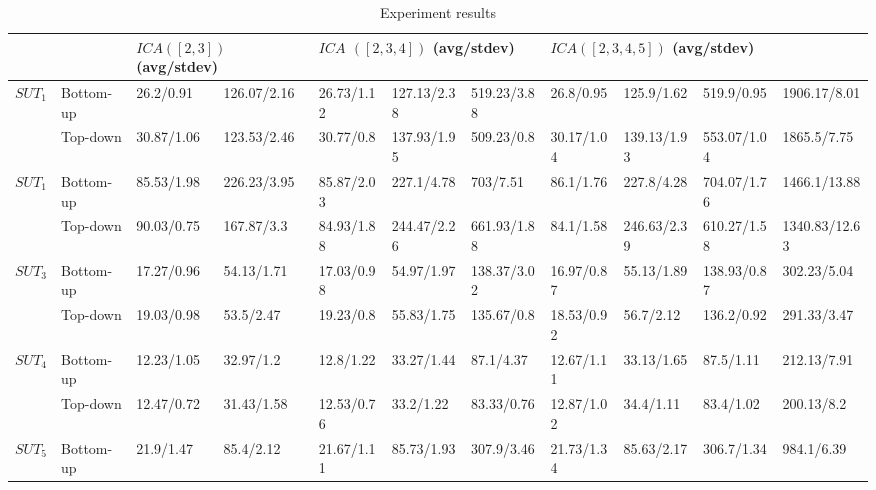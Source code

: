 \documentclass[conference]{IEEEtran}
\theoremstyle{definition}
\begin{document}

\begin{table}[htbp]
  \caption{Experiment results}
  \label{experiment_table}
\begin{tabular}{|l|l|ll|lll|llll|}
\hline
\multicolumn{2}{|l|}{}            & \multicolumn{2}{l|}{$ICA([2, 3])$ (avg/stdev)}& \multicolumn{3}{l|}{$ICA$ $([2, 3,4])$ (avg/stdev)}    & \multicolumn{4}{l|}{$ICA([2, 3,4,5])$ (avg/stdev) }                   \\ \hline
\multirow{2}{*}{$SUT_{1}$} & Bottom-up & 26.2/0.91        & 126.07/2.16      & 26.73/1.12 & 127.13/2.38 & 519.23/3.88 & 26.8/0.95  & 125.9/1.62  & 519.9/0.95  & 1906.17/8.01  \\
                      & Top-down  & 30.87/1.06       & 123.53/2.46      & 30.77/0.8  & 137.93/1.95 & 509.23/0.8  & 30.17/1.04 & 139.13/1.93 & 553.07/1.04 & 1865.5/7.75   \\ \hline
\multirow{2}{*}{$SUT_{1}$} & Bottom-up & 85.53/1.98       & 226.23/3.95      & 85.87/2.03 & 227.1/4.78  & 703/7.51    & 86.1/1.76  & 227.8/4.28  & 704.07/1.76 & 1466.1/13.88  \\
                      & Top-down  & 90.03/0.75       & 167.87/3.3       & 84.93/1.88 & 244.47/2.26 & 661.93/1.88 & 84.1/1.58  & 246.63/2.39 & 610.27/1.58 & 1340.83/12.63 \\ \hline
\multirow{2}{*}{$SUT_{3}$} & Bottom-up & 17.27/0.96       & 54.13/1.71       & 17.03/0.98 & 54.97/1.97  & 138.37/3.02 & 16.97/0.87 & 55.13/1.89  & 138.93/0.87 & 302.23/5.04   \\
                      & Top-down  & 19.03/0.98       & 53.5/2.47        & 19.23/0.8  & 55.83/1.75  & 135.67/0.8  & 18.53/0.92 & 56.7/2.12   & 136.2/0.92  & 291.33/3.47   \\ \hline
\multirow{2}{*}{$SUT_{4}$} & Bottom-up & 12.23/1.05       & 32.97/1.2        & 12.8/1.22  & 33.27/1.44  & 87.1/4.37   & 12.67/1.11 & 33.13/1.65  & 87.5/1.11   & 212.13/7.91   \\
                      & Top-down  & 12.47/0.72       & 31.43/1.58       & 12.53/0.76 & 33.2/1.22   & 83.33/0.76  & 12.87/1.02 & 34.4/1.11   & 83.4/1.02   & 200.13/8.2    \\ \hline
\multirow{2}{*}{$SUT_{5}$} & Bottom-up & 21.9/1.47        & 85.4/2.12        & 21.67/1.11 & 85.73/1.93  & 307.9/3.46  & 21.73/1.34 & 85.63/2.17  & 306.7/1.34  & 984.1/6.39    \\

\end{tabular}
\end{table}
\end{document}
